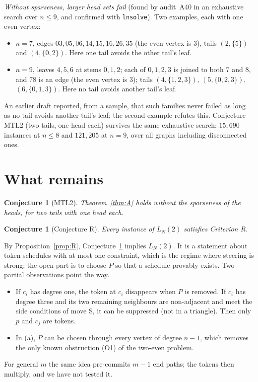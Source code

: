 \documentclass[11pt]{amsart}
\newtheorem{conjecture}[theorem]{Conjecture}
\theoremstyle{definition}
\begin{document}
\emph{Without sparseness, larger head sets fail} (found by audit~A40 in an exhaustive search over
$n\le9$, and confirmed with \texttt{lnsolve}). Two examples, each with one even vertex:
\begin{itemize}
\item $n=7$, edges $03,05,06,14,15,16,26,35$ (the even vertex is $3$), tails $(2,\{5\})$ and
$(4,\{0,2\})$. Here one tail avoids the other tail's leaf.
\item $n=9$, leaves $4,5,6$ at stems $0,1,2$; each of $0,1,2,3$ is joined to both $7$ and $8$, and
$78$ is an edge (the even vertex is $3$); tails $(4,\{1,2,3\})$, $(5,\{0,2,3\})$, $(6,\{0,1,3\})$. Here
no tail avoids another tail's leaf.
\end{itemize}
An earlier draft reported, from a sample, that such families never failed as long as no tail
avoids another tail's leaf; the second example refutes this. Conjecture MTL2 (two tails, one head
each) survives the same exhaustive search: $15{,}690$ instances at $n\le8$ and $121{,}205$ at $n=9$,
over all graphs including disconnected ones.

\section{What remains}\label{sec:open}

\begin{conjecture}[MTL2]\label{conj:mtl}
Theorem~\ref{thm:A} holds without the sparseness of the heads, for two tails with one head each.
\end{conjecture}

\begin{conjecture}[Conjecture R]\label{conj:R}
Every instance of $L_N(2)$ satisfies Criterion R.
\end{conjecture}

By Proposition~\ref{prop:R}, Conjecture~\ref{conj:R} implies $L_N(2)$. It is a statement about token
schedules with at most one constraint, which is the regime where steering is strong; the open part is
to choose $P$ so that a schedule provably exists. Two partial observations point the way.
\begin{itemize}
\item If $c_i$ has degree one, the token at $c_i$ disappears when $P$ is removed. If $c_i$ has
degree three and its two remaining neighbours are non-adjacent and meet the side conditions of
move S, it can be suppressed (not in a triangle). Then only $p$ and $c_j$ are tokens.
\item In (a), $P$ can be chosen through every vertex of degree $n-1$, which removes the only known
obstruction (O1) of the two-even problem.
\end{itemize}
For general $m$ the same idea pre-commits $m-1$ end paths; the tokens then multiply, and we have not
tested it.
\end{document}
